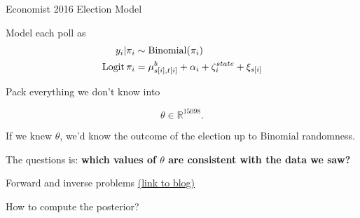 
\begin{frame}{Economist 2016 Election Model \citep{economist:2020:election}}

\begin{minipage}[c]{0.45\textwidth}
    \ElectionData{}
\end{minipage}
%
\begin{minipage}[c]{0.45\textwidth}
    Model each poll as
%
\begin{align*}
    y_i | \pi_i \sim{}& \mathrm{Binomial}(\pi_i) \\
    \mathrm{Logit }\, \pi_i ={}& \mu^b_{s[i],t[i]} + \alpha_i +  \zeta_i^{state} + \xi_{s[i]}\\
\end{align*}
%

\vspace{1em}
Pack everything we don't know into 

$$\theta \in \mathbb{R}^{15098}.$$

\vspace{1em}
If we knew $\theta$, we'd know the outcome of the election up to Binomial randomness.

\vspace{1em}
The questions is: \textbf{which values of $\theta$ are consistent with the data we saw?}

\end{minipage}
\end{frame}



\begin{frame}{Forward and inverse problems}
    \href{https://rgiordan.github.io/posts/2019-08-30-bayesian_as_inverse_problem.html}{(link to blog)}
\end{frame}


\begin{frame}{How to compute the posterior?}
\end{frame}



